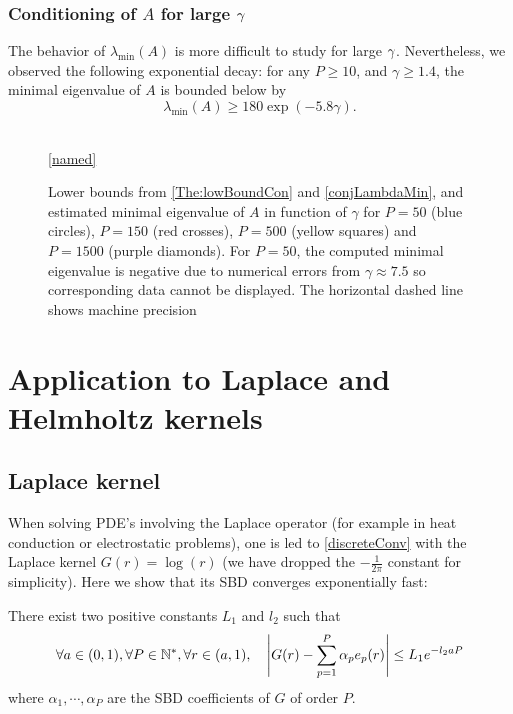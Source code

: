 \documentclass[smallextended]{svjour3}
\begin{document}
\subsubsection*{Conditioning of $A$ for large $\gamma$}																
The behavior of $\lambda_{\min}(A)$ is more difficult to study for large $\gamma$. Nevertheless, we observed the following exponential decay: for any $P \geq 10$, and $\gamma \geq 1.4$, the minimal eigenvalue of $A$ is bounded below by
\begin{equation}
	\label{conjLambdaMin}
	\lambda_{\min}(A) \geq 180 \exp(-5.8\gamma).
\end{equation}
\begin{figure}[H]
	\centering
	\\
	\ref{named}
	\caption{Lower bounds from \autoref{The:lowBoundCon} and \autoref{conjLambdaMin}, and estimated minimal eigenvalue of $A$ in function of $\gamma$ for $P=50$ (blue circles), $P=150$ (red crosses), $P=500$ (yellow squares) and $P=1500$ (purple diamonds). For $P=50$, the computed minimal eigenvalue is negative due to numerical errors from $\gamma \approx 7.5$ so corresponding data cannot be displayed. The horizontal dashed line shows machine precision}
\end{figure}
																		
\section{Application to Laplace and Helmholtz kernels}
\label{sec:ApplicationLaplaceHelmholtz}
\subsection{Laplace kernel}
When solving PDE's involving the Laplace operator (for example in heat conduction or electrostatic problems), one is led to \eqref{discreteConv} with the Laplace kernel $G(r) = \log(r)$ (we have dropped the $-\frac{1}{2\pi}$ constant for simplicity). Here we show that its SBD converges exponentially fast:
\begin{theorem} 
	\label{theRadialQuadLaplaceErreur}
	There exist two positive constants $L_1$ and $l_2$ such that
	\[ \forall a \in (0,1), \forall P \in \mathbb{N}^*, \forall r \in (a,1), \quad \left\lvert G(r) - \sum_{p=1}^P \alpha_p e_p(r) \right\rvert \leq L_1 e^{-l_2 a P} \]
	where $\alpha_1,\cdots,\alpha_P$ are the SBD coefficients of $G$ of order $P$.  
\end{theorem}
																		
\end{document}
